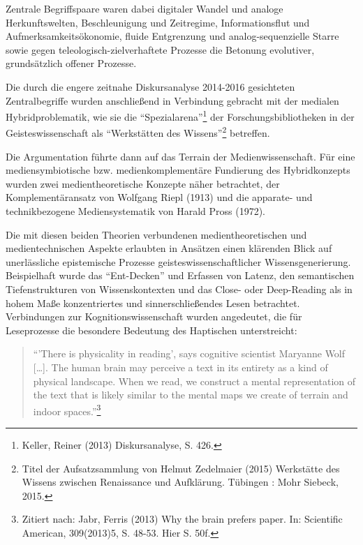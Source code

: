 \documentclass[a4paper,
fontsize=11pt,
oneside,
numbers=noperiodatend,
parskip=half-,
bibliography=totoc,
final
]{scrartcl}
\begin{document}
Zentrale Begriffspaare waren dabei digitaler Wandel und analoge
Herkunftswelten, Beschleunigung und Zeitregime, Informationsflut und
Aufmerksamkeitsökonomie, fluide Entgrenzung und analog-sequenzielle
Starre sowie gegen teleologisch-zielverhaftete Prozesse die Betonung
evolutiver, grundsätzlich offener Prozesse.

Die durch die engere zeitnahe Diskursanalyse 2014-2016 gesichteten
Zentralbegriffe wurden anschließend in Verbindung gebracht mit der
medialen Hybridproblematik, wie sie die \enquote{Spezialarena}\footnote{Keller,
  Reiner (2013) Diskursanalyse, S. 426.} der Forschungsbibliotheken in
der Geisteswissenschaft als \enquote{Werkstätten des Wissens}\footnote{Titel
  der Aufsatzsammlung von Helmut Zedelmaier (2015) Werkstätte des
  Wissens zwischen Renaissance und Aufklärung. Tübingen : Mohr Siebeck,
  2015.} betreffen.

Die Argumentation führte dann auf das Terrain der Medienwissenschaft.
Für eine mediensymbiotische bzw. medienkomplementäre Fundierung des
Hybridkonzepts wurden zwei medientheoretische Konzepte näher betrachtet,
der Komplementäransatz von Wolfgang Riepl (1913) und die apparate- und
technikbezogene Mediensystematik von Harald Pross (1972).

Die mit diesen beiden Theorien verbundenen medientheoretischen und
medientechnischen Aspekte erlaubten in Ansätzen einen klärenden Blick
auf unerlässliche epistemische Prozesse geisteswissenschaftlicher
Wissensgenerierung. Beispielhaft wurde das \enquote{Ent-Decken} und
Erfassen von Latenz, den semantischen Tiefenstrukturen von
Wissenskontexten und das Close- oder Deep-Reading als in hohem Maße
konzentriertes und sinnerschließendes Lesen betrachtet. Verbindungen zur
Kognitionswissenschaft wurden angedeutet, die für Leseprozesse die
besondere Bedeutung des Haptischen unterstreicht:

\begin{quote}
\enquote{'There is physicality in reading', says cognitive scientist
Maryanne Wolf {[}\ldots{}{]}. The human brain may perceive a text in its
entirety as a kind of physical landscape. When we read, we construct a
mental representation of the text that is likely similar to the mental
maps we create of terrain and indoor spaces.}\footnote{Zitiert nach:
  Jabr, Ferris (2013) Why the brain prefers paper. In: Scientific
  American, 309(2013)5, S. 48-53. Hier S. 50f.}
\end{quote}
\end{document}

